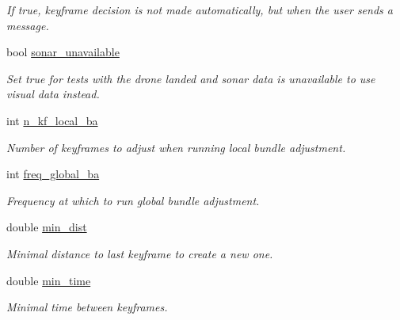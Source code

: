 \begin{DoxyCompactItemize}
\begin{DoxyCompactList}\small\item\em If true, keyframe decision is not made automatically, but when the user sends a message. \end{DoxyCompactList}\item 
\mbox{\label{classMap_a2472bc3b74a98eb9158ad866727ffee0}} 
bool \hyperlink{classMap_a2472bc3b74a98eb9158ad866727ffee0}{sonar\+\_\+unavailable}
\begin{DoxyCompactList}\small\item\em Set true for tests with the drone landed and sonar data is unavailable to use visual data instead. \end{DoxyCompactList}\item 
\mbox{\label{classMap_a794eea744a2ea7532fd6cf99a015410d}} 
int \hyperlink{classMap_a794eea744a2ea7532fd6cf99a015410d}{n\+\_\+kf\+\_\+local\+\_\+ba}
\begin{DoxyCompactList}\small\item\em Number of keyframes to adjust when running local bundle adjustment. \end{DoxyCompactList}\item 
\mbox{\label{classMap_a0452c93c8870a6cb76660fb75be202fb}} 
int \hyperlink{classMap_a0452c93c8870a6cb76660fb75be202fb}{freq\+\_\+global\+\_\+ba}
\begin{DoxyCompactList}\small\item\em Frequency at which to run global bundle adjustment. \end{DoxyCompactList}\item 
\mbox{\label{classMap_a45d93dc7966ef968d3730754526549ea}} 
double \hyperlink{classMap_a45d93dc7966ef968d3730754526549ea}{min\+\_\+dist}
\begin{DoxyCompactList}\small\item\em Minimal distance to last keyframe to create a new one. \end{DoxyCompactList}\item 
\mbox{\label{classMap_a080c23dee123aa9c5ddabb012a43ea55}} 
double \hyperlink{classMap_a080c23dee123aa9c5ddabb012a43ea55}{min\+\_\+time}
\begin{DoxyCompactList}\small\item\em Minimal time between keyframes. \end{DoxyCompactList}\item 

\end{DoxyCompactItemize}
